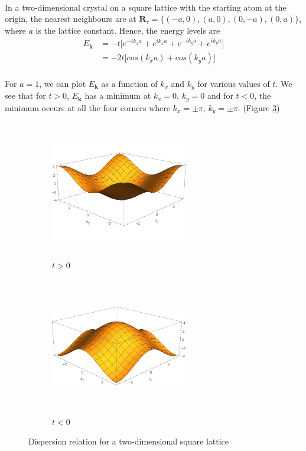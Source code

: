 \documentclass{article}
\begin{document}
\\
In a two-dimensional crystal on a square lattice with the starting atom at the origin, the nearest neighbours are at  $\textbf{R}_\tau = \{(-a,0),(a,0), (0, -a), (0, a) \}$, where $a$ is the lattice constant. Hence, the energy levels are
\\
\begin{equation}
\begin{split}
E_\textbf{k} &= -t\big[e^{-i k_x a} +e^{i k_x a}+e^{-i k_y a}+e^{i k_y a}    \big] \\
 &= -2t \big[cos(k_x a) + cos(k_y a)\big]
 \end{split}
\end{equation}
\\
For $a = 1$, we can plot $E_\textbf{k}$ as a function of $k_x$ and $k_y$ for various values of $t$. We see that for $t>0$, $E_\textbf{k}$  has a minimum at $k_x =0$, $k_y=0$ and for $t<0$, the minimum occurs at all the four corners where $k_x = \pm \pi$, $k_y=\pm \pi$. (Figure \ref{fig:sq})


\begin{figure}[H]
\centering
\begin{subfigure}{.5\textwidth}
  \centering
  \includegraphics[clip,trim={0 1cm 0 1.2cm},height=6cm, width=6cm, keepaspectratio]{tgsq.pdf}
  \caption{$t > 0$}
  \label{fig:sub1}
\end{subfigure}%
\begin{subfigure}{.5\textwidth}
  \centering
  \includegraphics[width= 6cm, height=6cm, keepaspectratio]{tlsq.pdf}
  \caption{$t<0$}
  \label{fig:sub2}
\end{subfigure}
\caption{Dispersion relation for a two-dimensional square lattice}
\label{fig:sq}
\end{figure}
\end{document}
